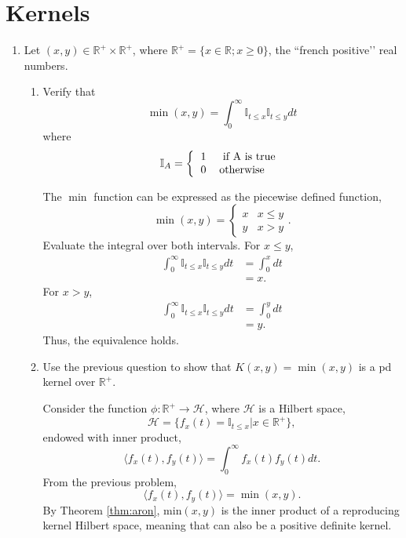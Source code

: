 \documentclass{article}[12pt]
\begin{document}
\section{Kernels}
\begin{enumerate}
\item Let $(x,y) \in \mathbb{R}^+ \times \mathbb{R}^+$, where $\mathbb{R}^+=\{x \in \mathbb{R};x \geq 0\}$, the ``french positive\rq\rq{} real numbers. 
\begin{enumerate}
\item 
Verify that 
$$\min(x,y) = \int_0^\infty \mathbb{I}_{t\leq x} \mathbb{I}_{t\leq y} dt$$
where  
$$\mathbb{I}_A =  \left\{
\begin{tabular}{ll}
1 & \mbox{ if A is true}\\
0 & \mbox{otherwise}
\end{tabular}
\right.
$$ 

The $\operatorname{min}$ function can be expressed as the piecewise defined function,
\begin{equation}
\operatorname{min}(x,y)=\left\{\begin{array}{ll}{x} & {x \le y} \\ {y} & {x > y}\end{array}\right. .
\end{equation}
Evaluate the integral over both intervals. For $x \le y$,
\begin{equation}
\begin{aligned}
\int_{0}^{\infty} \mathbb{I}_{t \leq x} \mathbb{I}_{t \leq y} d t &= \int_{0}^{x}  d t \\
&= x .
\end{aligned}
\end{equation}
For $x > y$,
\begin{equation}
\begin{aligned}
\int_{0}^{\infty} \mathbb{I}_{t \leq x} \mathbb{I}_{t \leq y} d t &= \int_{0}^{y}  d t \\
&= y .
\end{aligned}
\end{equation}
Thus, the equivalence holds.


\item Use the previous question to show that $K(x,y)=\min(x,y)$ is a pd kernel over $\mathbb{R}^+$.


Consider the function $\phi:\mathbb R^+ \rightarrow \mathcal H$,  where $\mathcal H$ is a Hilbert space,
\begin{equation}
\mathcal H = \{f_x(t) = \mathbb{I}_{t \le x} | x \in \mathbb R^+\},
\end{equation}
endowed with inner product,
\begin{equation}
\langle f_x(t), f_y(t) \rangle = \int_{0}^{\infty}f_x(t)  f_y(t) d t.
\end{equation}
From the previous problem,
\begin{equation}
\langle f_x(t), f_y(t) \rangle = \operatorname{min}(x,y).
\end{equation}
By Theorem \ref{thm:aron}, $\text{min}(x,y)$ is the inner product of a reproducing kernel Hilbert space, meaning that can also be a positive definite kernel.



\end{enumerate}
\end{enumerate}
\end{document}
